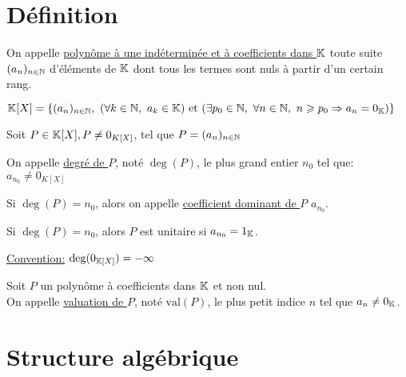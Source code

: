\documentclass[12pt,twoside,a4paper]{article}
\author{MPSI 2}
\begin{document}
	\maketitle
	\section{Définition}
		\begin{defi}
			On appelle \underline{polyn\^ome \`a une indéterminée et \`a coefficients dans $\mathbb{K}$} toute suite $(a_n)_{n\in\mathbb{N}}$ d'éléments de $\mathbb{K}$ dont tous les termes sont nuls \`a partir d'un certain rang.
		\end{defi}
		\begin{flushleft}
			$\K[X]=\{(a_n)_{n\in\N},\ (\forall k\in\N,\ a_k\in\K)\et (\exists p_0\in\N,\ \forall n\in\N,\ n\geqslant p_0\Rightarrow a_n=0_\K) \}$
		\end{flushleft}
		\begin{defi}
			Soit $P\in \mathbb{K}[X], P\neq 0_{K[X]}$, tel que $P=(a_n)_{n\in\mathbb{N}}$
			\begin{liste}
				\item On appelle \underline{degré de $P$}, noté $\deg(P)$, le plus grand entier $n_0$ tel que: $a_{n_0}\neq 0_{K[X]}$
				\item Si $\deg(P)=n_0$, alors on appelle \underline{coefficient dominant de $P$} $a_{n_0}$.
				\item Si $\deg(P)=n_0$, alors $P$ est unitaire si $a_{n_0}=1_{\mathbb{K}}$.
			\end{liste}
		\end{defi}
		\begin{flushleft}
			\underline{Convention:} $\deg(0_{\mathbb{K}[X]})=-\infty$
		\end{flushleft}
		\begin{defi}
			Soit $P$ un polynôme \`a coefficients dans $\mathbb{K}$ et non nul.\\
			On appelle \underline{valuation de $P$}, noté $\mathrm{val}(P)$, le plus petit indice $n$ tel que $a_n\neq0_{\mathbb{K}}$.
		\end{defi}
	\section{Structure algébrique}
\end{document}

